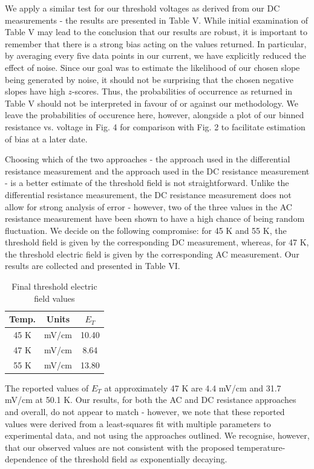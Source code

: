 \documentclass[aps,prl,nofootinbib,twocolumn,superscriptaddress,groupedaddress]{revtex4}  %
\begin{document}
We apply a similar test for our threshold voltages as derived from our DC measurements - the results are presented in Table V. While initial examination of Table V may lead to the conclusion that our results are robust, it is important to remember that there is a strong bias acting on the values returned. In particular, by averaging every five data points in our current, we have explicitly reduced the effect of noise. Since our goal was to estimate the likelihood of our chosen slope being generated by noise, it should not be surprising that the chosen negative slopes have high $z$-scores. Thus, the probabilities of occurrence as returned in Table V should not be interpreted in favour of or against our methodology. We leave the probabilities of occurence here, however, alongside a plot of our binned resistance vs. voltage in Fig. 4 for comparison with Fig. 2 to facilitate estimation of bias at a later date.

Choosing which of the two approaches - the approach used in the differential resistance measurement and the approach used in the DC resistance measurement - is a better estimate of the threshold field is not straightforward. Unlike the differential resistance measurement, the DC resistance measurement does not allow for strong analysis of error - however, two of the three values in the AC resistance measurement have been shown to have a high chance of being random fluctuation. We decide on the following compromise: for 45 K and 55 K, the threshold field is given by the corresponding DC measurement, whereas, for 47 K, the threshold electric field is given by the corresponding AC measurement. Our results are collected and presented in Table VI.

\begin{table}[h]
\caption{\label{tab:table3} Final threshold electric field values}
\begin{ruledtabular}
\begin{tabular}{ccc}
Temp. & Units & $E_{T}$ \\
\hline
45 K & mV/cm& 10.40 \\
47 K &mV/cm & 8.64 \\
55 K & mV/cm& 13.80\\
\end{tabular}
\end{ruledtabular}
\end{table} 

The reported values\cite{et} of $E_{T}$ at approximately 47 K are 4.4 mV/cm and 31.7 mV/cm at 50.1 K. Our results, for both the AC and DC resistance approaches and overall, do not appear to match - however, we note that these reported values were derived from a least-squares fit with multiple parameters to experimental data\cite{et}, and not using the approaches outlined. We recognise, however, that our observed values are not consistent with the proposed temperature-dependence of the threshold field as exponentially decaying\cite{ong}. 
\end{document}
